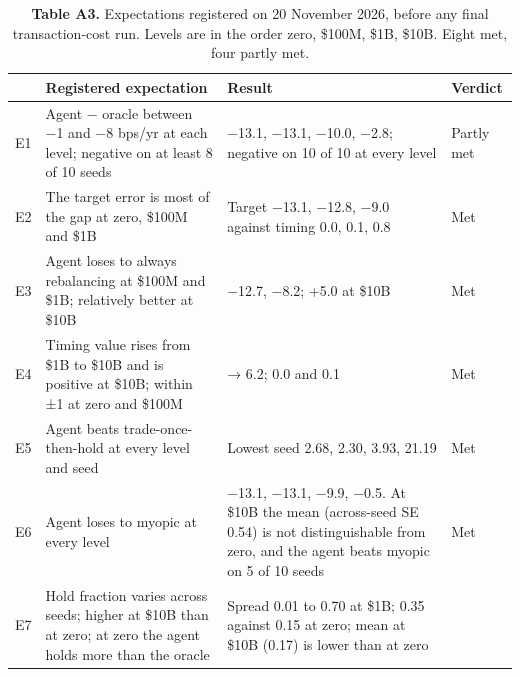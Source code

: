 \documentclass[
  11pt]{article}
\begin{document}
\begin{table}[htbp]
\centering\small
\caption{\textbf{Table A3.} Expectations registered on 20 November 2026,
before any final transaction-cost run. Levels are in the order zero,
\$100M, \$1B, \$10B. Eight met, four partly met.}
\begin{tabular}{@{}
  >{\raggedright\arraybackslash}p{}
  >{\raggedright\arraybackslash}p{}
  >{\raggedright\arraybackslash}p{}
  >{\raggedright\arraybackslash}p{}@{}}
\toprule\noalign{}
\begin{minipage}[b]{\linewidth}\raggedright
\end{minipage} & \begin{minipage}[b]{\linewidth}\raggedright
Registered expectation
\end{minipage} & \begin{minipage}[b]{\linewidth}\raggedright
Result
\end{minipage} & \begin{minipage}[b]{\linewidth}\raggedright
Verdict
\end{minipage} \\
\midrule\noalign{}
E1 & Agent − oracle between −1 and −8 bps/yr at each level; negative on
at least 8 of 10 seeds & −13.1, −13.1, −10.0, −2.8; negative on 10 of 10
at every level & Partly met \\
E2 & The target error is most of the gap at zero, \$100M and \$1B &
Target −13.1, −12.8, −9.0 against timing 0.0, 0.1, 0.8 & Met \\
E3 & Agent loses to always rebalancing at \$100M and \$1B; relatively
better at \$10B & −12.7, −8.2; +5.0 at \$10B & Met \\
E4 & Timing value rises from \$1B to \$10B and is positive at \$10B;
within ±1 at zero and \$100M & 0.8 → 6.2; 0.0 and 0.1 & Met \\
E5 & Agent beats trade-once-then-hold at every level and seed & Lowest
seed 2.68, 2.30, 3.93, 21.19 & Met \\
E6 & Agent loses to myopic at every level & −13.1, −13.1, −9.9, −0.5. At
\$10B the mean (across-seed SE 0.54) is not distinguishable from zero,
and the agent beats myopic on 5 of 10 seeds & Met \\
E7 & Hold fraction varies across seeds; higher at \$10B than at zero; at
zero the agent holds more than the oracle & Spread 0.01 to 0.70 at \$1B;
0.35 against 0.15 at zero; mean at \$10B (0.17) is lower than at zero

\end{tabular}
\end{table}
\end{document}
